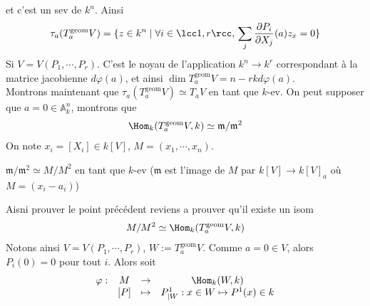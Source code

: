             et c'est un sev de $k^n$. Ainsi 
            \begin{align*}
                \tau_a(T_a^\mathrm{geom}V) = \{z \in k^n \mid \forall i \in \lcc 1,r \rcc,\, \sum_j \frac{\partial P_i}{\partial X_j}(a) z_x = 0\}
            \end{align*}
            Si $V = V(P_1, \cdots, P_r)$. C'est le noyau de l'application $k^n \to k^r$ correspondant à la matrice jacobienne $d \varphi(a)$, et ainsi $\dim T_a^\mathrm{geom}V = n - rk d \varphi(a)$. \\
            Montrons maintenant que $\tau_a(T_a^\mathrm{geom}V) \simeq T_aV$ en tant que $k$-ev. On peut supposer que $a = 0 \in \mathbb{A}^n_k$, montrons que 
            \begin{align*}
                \Hom_k(T_a^\mathrm{geom}V, k) \simeq \mathfrak{m}/\mathfrak{m}^2
            \end{align*}
            On note $x_i = [X_i] \in k[V]$, $M = (x_1, \cdots, x_n)$.
            \begin{exo}
                $\mathfrak{m}/\mathfrak{m}^2 \simeq M/M^2$ en tant que $k$-ev ($\mathfrak{m}$ est l'image de $M$ par $k[V] \to k[V]_a$ où $M = (x_i - a_i)$) 
            \end{exo}
            Aisni prouver le point précédent reviens a prouver qu'il existe un isom
            \begin{align*}
                M/M^2 \simeq \Hom_k(T_a^\mathrm{geom}V, k) 
            \end{align*}
            Notons ainsi $V = V(P_1, \cdots, P_r)$, $W := T_a^\mathrm{geom}V$. Comme $a = 0 \in V$, alors $P_i(0) = 0$ pour tout $i$. Alors soit
            \begin{align*}
                \begin{array}{cccc}
                    \varphi : & M & \to & \Hom_k(W,k) \\
                    & [P] & \mapsto & P^1_{|W} : x \in W \mapsto P^1(x) \in k \\
                \end{array}
            \end{align*}
